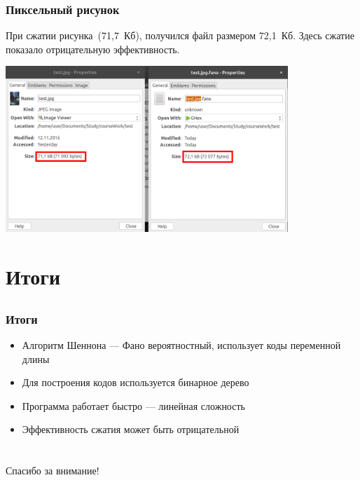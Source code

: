 \documentclass[10pt,pdf,hyperref={unicode}]{beamer}
\begin{document}
\begin{frame}\frametitle{Пиксельный рисунок}
		При сжатии рисунка~(71,7~Кб), 
		получился файл размером 72,1~Кб. Здесь сжатие показало 
		отрицательную эффективность.\newline

		\centering
		\includegraphics[width=0.8\textwidth]{compare2.png}
\end{frame}

\section{Итоги}
\subsection{}

\begin{frame}[t]\frametitle{Итоги}
	\begin{itemize}
		\item Алгоритм Шеннона --- Фано вероятностный, использует коды переменной длины
		\item Для построения кодов используется бинарное дерево
		\item Программа работает быстро --- линейная сложность
		\item Эффективность сжатия может быть отрицательной
	\end{itemize}

\end{frame}

\section{}

\begin{frame}
	\thispagestyle{empty}
	\centerline{Спасибо за внимание!}
\end{frame}
\end{document}
